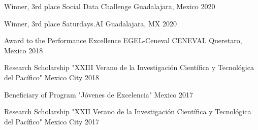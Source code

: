 


\begin{cvhonors}

  \cvhonor
    {Winner, 3rd place} %
    {Social Data Challenge} %
    {Guadalajara, Mexico} %
    {2020} %
    
\end{cvhonors}


\begin{cvhonors}

  \cvhonor
    {Winner, 3rd place} %
    {Saturdays.AI} %
    {Guadalajara, MX} %
    {2020} %

  \cvhonor
    {Award to the Performance Excellence EGEL-Ceneval} %
    {CENEVAL} %
    {Queretaro, Mexico} %
    {2018} %

  \cvhonor
    {Research Scholarship} %
    {"XXIII Verano de la Investigación Científica y Tecnológica del Pacífico"} %
    {Mexico City} %
    {2018} %
    
  \cvhonor
    {Beneficiary of Program} %
    {"Jóvenes de Excelencia"} %
    {Mexico} %
    {2017} %

  \cvhonor
    {Research Scholarship} %
    {"XXII Verano de la Investigación Científica y Tecnológica del Pacífico"} %
    {Mexico City} %
    {2017} %

\end{cvhonors}
